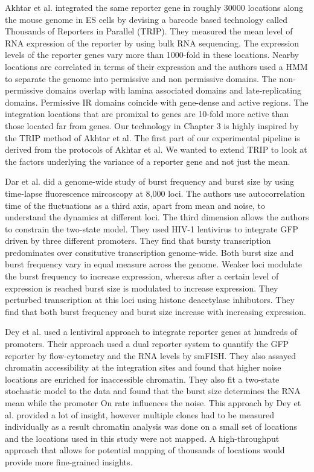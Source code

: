 Akhtar et al. \cite {Akhtar} integrated the same reporter gene in roughly 30000 locations along the mouse genome in ES cells by devising a barcode based technology called Thousands of Reporters in Parallel (TRIP). They measured the mean level of RNA expression of the reporter by using bulk RNA sequencing. The expression levels of the reporter genes vary more than 1000-fold in these locations. Nearby locations are correlated in terms of their expression and the authors used a HMM to separate the genome into permissive and non permissive domains. The non-permissive domains overlap with lamina associated domains and late-replicating domains. Permissive IR domains coincide with gene-dense and active regions. The integration locations that are promixal to genes are 10-fold more active than those located far from genes. Our technology in Chapter 3 is highly inspired by the TRIP method of Akhtar et al. The first part of our experimental pipeline is derived from the protocols of Akhtar et al. We wanted to extend TRIP to look at the factors underlying the variance of a reporter gene and not just the mean.

Dar et al. \cite{Dar} did a genome-wide study of burst frequency and burst size by using time-lapse fluorescence mircoscopy at 8,000 loci. The authors use autocorrelation time of the fluctuations as a third axis, apart from mean and noise, to understand the dynamics at different loci. The third dimension allows the authors to constrain the two-state model. They used HIV-1 lentivirus to integrate GFP driven by three different promoters. They find that bursty transcription predominates over consitutive transcription genome-wide. Both burst size and burst frequency vary in equal measure across the genome. Weaker loci modulate the burst frequency to increase expression, whereas after a certain level of expression is reached burst size is modulated to increase expression. They perturbed transcription at this loci using histone deacetylase inhibutors. They find that both burst frequency and burst size increase with increasing expression. 

Dey et al. \cite{Dey} used a lentiviral approach to integrate reporter genes at hundreds of promoters. Their approach used a dual reporter system to quantify the GFP reporter by flow-cytometry and the RNA levels by smFISH. They also assayed chromatin accessibility at the integration sites and found that higher noise locations are enriched for inaccessible chromatin. They also fit a two-state stochastic model to the data and found that the burst size determines the RNA mean while the promoter On rate influences the noise. This approach by Dey et al. provided a lot of insight, however multiple clones had to be measured individually as a result chromatin analysis was done on a small set of locations and the locations used in this study were not mapped. A high-throughput approach that allows for potential mapping of thousands of locations would provide more fine-grained insights.


